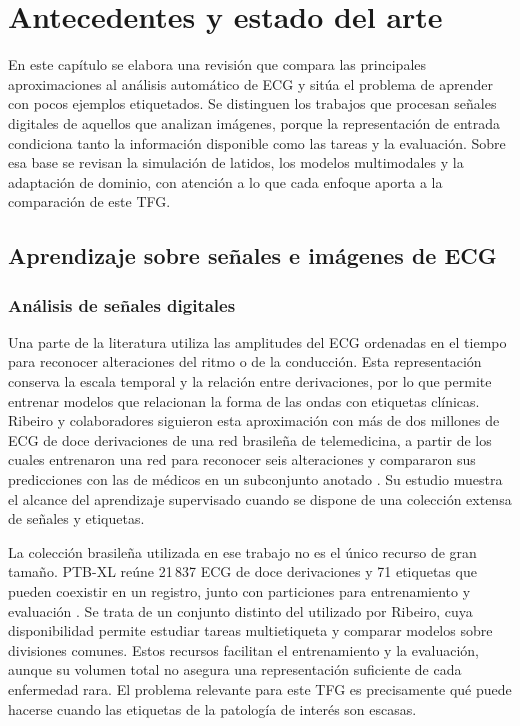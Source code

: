 \chapter{Antecedentes y estado del arte}
\label{chap:relacionados}

En este capítulo se elabora una revisión que compara las principales aproximaciones al análisis automático de ECG y sitúa el problema de aprender con pocos ejemplos etiquetados. Se distinguen los trabajos que procesan señales digitales de aquellos que analizan imágenes, porque la representación de entrada condiciona tanto la información disponible como las tareas y la evaluación. Sobre esa base se revisan la simulación de latidos, los modelos multimodales y la adaptación de dominio, con atención a lo que cada enfoque aporta a la comparación de este TFG.

\section{Aprendizaje sobre señales e imágenes de ECG}
\label{sec:antecedentes_imagen}

\subsection{Análisis de señales digitales}

Una parte de la literatura utiliza las amplitudes del ECG ordenadas en el tiempo para reconocer alteraciones del ritmo o de la conducción. Esta representación conserva la escala temporal y la relación entre derivaciones, por lo que permite entrenar modelos que relacionan la forma de las ondas con etiquetas clínicas. Ribeiro y colaboradores siguieron esta aproximación con más de dos millones de ECG de doce derivaciones de una red brasileña de telemedicina, a partir de los cuales entrenaron una red para reconocer seis alteraciones y compararon sus predicciones con las de médicos en un subconjunto anotado \cite{ribeiro2020}. Su estudio muestra el alcance del aprendizaje supervisado cuando se dispone de una colección extensa de señales y etiquetas.

La colección brasileña utilizada en ese trabajo no es el único recurso de gran tamaño. PTB-XL reúne 21\,837 ECG de doce derivaciones y 71 etiquetas que pueden coexistir en un registro, junto con particiones para entrenamiento y evaluación \cite{wagner2020}. Se trata de un conjunto distinto del utilizado por Ribeiro, cuya disponibilidad permite estudiar tareas multietiqueta y comparar modelos sobre divisiones comunes. Estos recursos facilitan el entrenamiento y la evaluación, aunque su volumen total no asegura una representación suficiente de cada enfermedad rara. El problema relevante para este TFG es precisamente qué puede hacerse cuando las etiquetas de la patología de interés son escasas.

